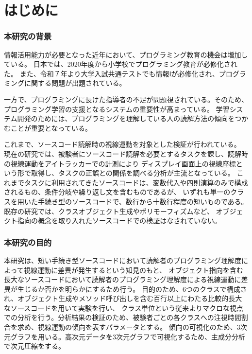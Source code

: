 \documentclass[paper=a4paper,fontsize=11pt]{jlreq}
\begin{document}
\tableofcontents
\clearpage

\part{はじめに}
  \section{本研究の背景}
    情報活用能力が必要となった近年において、プログラミング教育の機会は増加している。
    日本では、2020年度から小学校でプログラミング教育が必修化された\cite{syougaku_program}。
    また、令和７年より大学入試共通テストでも情報Ⅰが必修化され、プログラミングに関する問題が出題されている\cite{tusuto_mondai}。

    一方で、プログラミングに長けた指導者の不足が問題視されている。そのため、プログラミング学習の支援となるシステムの重要性が高まっている。
    学習システム開発のためには、プログラミングを理解している人の読解方法の傾向をつかむことが重要となっている。
    
    これまで、ソースコード読解時の視線運動を対象とした検証が行われている\cite{meiji2021}\cite{hanafusa}\cite{uwano}。
    現在の研究では、被験者にソースコード読解を必要とするタスクを課し、読解時の視線運動をアイトラッカーでの計測により
    ディスプレイ画面上の視線座標という形で取得し、タスクの正誤との関係を調べる分析が主流となっている。
    これまでタスクに利用されてきたソースコードは、変数代入や四則演算のみで構成されるもの、条件分岐や繰り返し文を含むものであるが、
    いずれも単一のクラスを用いた手続き型のソースコードで、数行から十数行程度の短いものである。既存の研究では、クラスオブジェクト生成やポリモーフィズムなど、
    オブジェクト指向の概念を取り入れたソースコードでの検証はなされていない。
  \clearpage
  
  \section{本研究の目的}
    本研究は、短い手続き型ソースコードにおいて読解者のプログラミング理解度によって視線運動に差異が発生するという知見のもと、
    オブジェクト指向を含む長大なソースコードにおいて読解者のプログラミング理解度による視線運動に差異が生じるか否かを明らかにするため行う。
    目的のため、6つのクラスで構成され、オブジェクト生成やメソッド呼び出しを含む百行以上にわたる比較的長大なソースコードを用いて実験を行い、
    クラス単位という従来よりマクロな視点での分析を行う。分析結果の検証のため、被験者ごとの各クラスへの注視時間割合を求め、視線運動の傾向を表すパラメータとする。
    傾向の可視化のため、3次元グラフを用いる。高次元データを3次元グラフで可視化するため、主成分分析で次元圧縮をする。
    \clearpage
\end{document}
